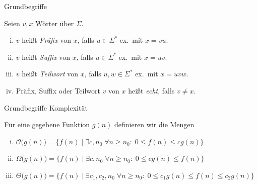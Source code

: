 \documentclass[xcolor=dvipsnames, aspectratio=169]{beamer}
\begin{document}
\begin{frame}[<+->]{Grundbegriffe}
\begin{defi}
Seien $v,x$ Wörter über $\Sigma$.
\begin{enumerate}[(i)]
\item $v$ heißt \textit{Präfix} von $x$, falls $u\in\Sigma^*$ ex.\ mit $x=vu$.
\item $v$ heißt \textit{Suffix} von $x$, falls $u\in\Sigma^*$ ex.\ mit $x=uv$.
\item $v$ heißt \textit{Teilwort} von $x$, falls $u,w\in\Sigma^*$ ex.\ mit $x=uvw$.
\item Präfix, Suffix oder Teilwort $v$ von $x$ heißt \textit{echt}, falls $v\neq x$.
\end{enumerate}
\end{defi}
\end{frame}

\begin{frame}[<+->]{Grundbegriffe Komplexität}
\begin{defi}
Für eine gegebene Funktion $g(n)$ definieren wir die Mengen
\begin{enumerate}[(i)]
\item $\mathcal{O}\big(g(n)\big)=\big\{f(n)\;\big\vert\;\exists c,n_0\;\forall n\geq n_0 :\; 0\leq f(n)\leq cg(n)\big\}$
\item $\Omega\big(g(n)\big)=\big\{f(n)\;\big\vert\;\exists c,n_0\;\forall n\geq n_0 :\; 0\leq cg(n)\leq f(n)\big\}$
\item $\Theta\big(g(n)\big)=\big\{f(n)\;\big\vert\;\exists c_1,c_2,n_0\;\forall n\geq n_0 :\; 0\leq c_1g(n)\leq f(n)\leq c_2g(n)\big\}$
\end{enumerate}
\end{defi}\medskip
{}
\end{frame}

\end{document}
